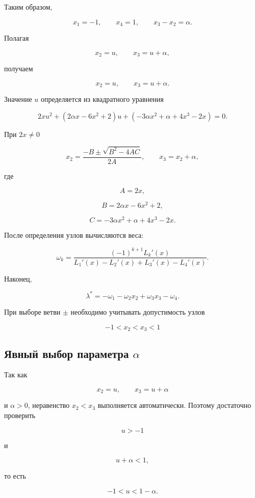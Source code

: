 \documentclass[12pt,a4paper]{article}
\begin{document}
	Таким образом,
	
	$$
	\boxed{
		x_1=-1,\qquad
		x_4=1,\qquad
		x_3-x_2=\alpha.
	}
	$$
	
	Полагая
	
	$$
	x_2=u,\qquad
	x_3=u+\alpha,
	$$
	
	получаем
	
	$$
	\boxed{
		x_2=u,\qquad
		x_3=u+\alpha.
	}
	$$
	
	Значение $u$ определяется из квадратного уравнения
	
	$$
	\boxed{
		2xu^2
		+
		\left(
		2\alpha x-6x^2+2
		\right)u
		+
		\left(
		-3\alpha x^2+\alpha+4x^3-2x
		\right)
		=0.
	}
	$$
	
	При $2x\ne0$
	
	$$
	\boxed{
		x_2=
		\frac{-B\pm\sqrt{B^2-4AC}}{2A},
		\qquad
		x_3=x_2+\alpha,
	}
	$$
	
	где
	
	$$
	\boxed{
		A=2x,
	}
	$$
	
	$$
	\boxed{
		B=
		2\alpha x-6x^2+2,
	}
	$$
	
	$$
	\boxed{
		C=
		-3\alpha x^2+\alpha+4x^3-2x.
	}
	$$
	
	После определения узлов вычисляются веса:
	
	$$
	\boxed{
		\omega_k=
		\frac{
			(-1)^{k+1}L_k'(x)
		}{
			L_1'(x)-L_2'(x)+L_3'(x)-L_4'(x)
		}.
	}
	$$
	
	Наконец,
	
	$$
	\boxed{
		\lambda^*
		=
		-\omega_1-\omega_2x_2+\omega_3x_3-\omega_4.
	}
	$$
	
	При выборе ветви $\pm$ необходимо учитывать допустимость узлов
	
	$$
	\boxed{
		-1<x_2<x_3<1
	}
	$$
	
	\newpage
	\subsection{Явный выбор параметра $\alpha$}
	
	
	Так как
	
	$$
	x_2=u,\qquad x_3=u+\alpha
	$$
	
	и $\alpha>0$, неравенство $x_2<x_3$ выполняется автоматически. Поэтому достаточно проверить
	
	$$
	u>-1
	$$
	
	и
	
	$$
	u+\alpha<1,
	$$
	
	то есть
	
	$$
	\boxed{
		-1<u<1-\alpha.
	}
	$$
	
\end{document}
